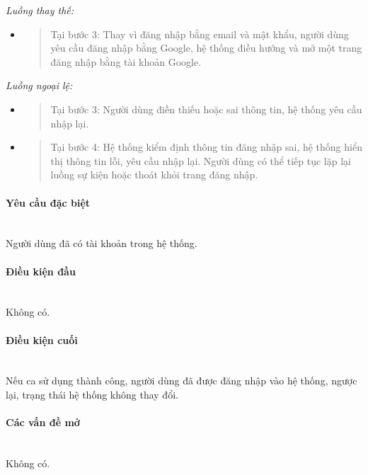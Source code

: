\documentclass[./../main.tex]{subfiles}
\begin{document}
\emph{Luồng thay thế:}

\begin{itemize}
\item
  \begin{quote}
  Tại bước 3: Thay vì đăng nhập bằng email và mật khẩu, người dùng yêu
  cầu đăng nhập bằng Google, hệ thống điều hướng và mở một trang đăng
  nhập bằng tài khoản Google.
  \end{quote}
\end{itemize}

\emph{Luồng ngoại lệ:}

\begin{itemize}
\item
  \begin{quote}
  Tại bước 3: Người dùng điền thiếu hoặc sai thông tin, hệ thống yêu cầu
  nhập lại.
  \end{quote}
\item
  \begin{quote}
  Tại bước 4: Hệ thống kiểm định thông tin đăng nhập sai, hệ thống hiển
  thị thông tin lỗi, yêu cầu nhập lại. Người dùng có thể tiếp tục lặp
  lại luồng sự kiện hoặc thoát khỏi trang đăng nhập.
  \end{quote}
\end{itemize}

\paragraph*{Yêu cầu đặc biệt} ~\\

Người dùng đã có tài khoản trong hệ thống.

\paragraph*{Điều kiện đầu} ~\\

Không có.

\paragraph*{Điều kiện cuối} ~\\

Nếu ca sử dụng thành công, người dùng đã được đăng nhập vào hệ thống,
ngược lại, trạng thái hệ thống không thay đổi.

\paragraph*{Các vấn đề mở} ~\\

Không có.
\end{document}
